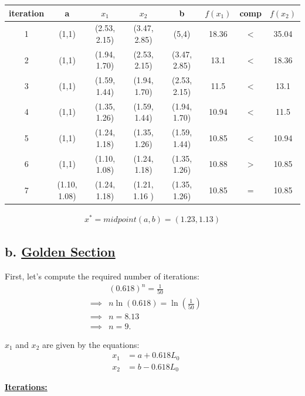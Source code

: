 \documentclass{article}
\begin{document}
\begin{tabular}{ |c|c|c|c|c|c|c|c| }
\hline
iteration & a & $x_1$ & $x_2$ & b & $f(x_1)$ & comp & $f(x_2)$ \\ 
\hline 
1 & (1,1) & (2.53, 2.15)  & (3.47, 2.85)  & (5,4) & 18.36 & $<$ & 35.04 \\ 
\hline 
2 & (1,1) & (1.94, 1.70)  & (2.53, 2.15) & (3.47, 2.85) & 13.1 & $<$ & 18.36 \\ 
\hline
3 & (1,1) & (1.59, 1.44)  & (1.94, 1.70) & (2.53, 2.15) & 11.5 & $<$ & 13.1 \\ 
\hline
4 & (1,1) & (1.35, 1.26)  & (1.59, 1.44) & (1.94, 1.70) & 10.94 & $<$ & 11.5 \\ 
\hline
5 & (1,1) & (1.24, 1.18)  & (1.35, 1.26) & (1.59, 1.44) & 10.85 & $<$ & 10.94 \\ 
\hline
6 & (1,1) & (1.10, 1.08) & (1.24, 1.18) & (1.35, 1.26) & 10.88 & $>$ & 10.85 \\ 
\hline
7 & (1.10, 1.08) & (1.24, 1.18) & (1.21, 1.16 ) & (1.35, 1.26) & 10.85 & = & 10.85 \\ 
\hline
\end{tabular}
\newline

\begin{align*}
  x^* = midpoint(a,b) = (1.23, 1.13)
\end{align*}


\subsection*{b. \textbf{\underline{Golden Section}}}
First, let's compute the required number of iterations:
\begin{align*}
  &(0.618)^n = \frac{1}{50} &&\\
  \implies& n\ln(0.618) = \ln(\frac{1}{50}) &&\\
  \implies& n = 8.13 &&\\
  \implies& n = 9.
\end{align*}

$x_1$ and $x_2$ are given by the equations:
\begin{align*}
  x_1 &= a + 0.618 L_0 &&\\
  x_2 &= b - 0.618 L_0
\end{align*}

\textbf{\underline{Iterations:}}
\newline
\end{document}
